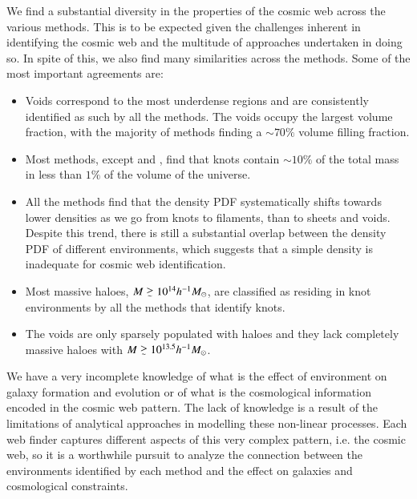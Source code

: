 We find a substantial diversity in the properties of the cosmic web across the various methods. This is to be expected given the challenges inherent in identifying the cosmic web and the multitude of approaches undertaken in doing so. In spite of this, we also find many similarities across the methods. Some of the most important agreements are:
\begin{itemize}
	\item Voids correspond to the most underdense regions and are consistently identified as such by all the methods. The voids occupy the largest volume fraction, with the majority of methods finding a ${\sim}70\%$ volume filling fraction.
	\item Most methods, except \origami{} and \tweb{}, find that knots contain ${\sim}10\%$ of the total mass in less than $1\%$ of the volume of the universe.
	\item All the methods find that the density PDF systematically shifts towards lower densities as we go from knots to filaments, than to sheets and voids. Despite this trend, there is still a substantial overlap between the density PDF of different environments, which suggests that a simple density is inadequate for cosmic web identification. 
	\item Most massive haloes, $M\gsim10^{14}h^{-1}M_{\odot}$, are classified as residing in knot environments by all the methods that identify knots.
	\item The voids are only sparsely populated with haloes and they lack completely massive haloes with $M\gsim10^{13.5}h^{-1}M_{\odot}$.
\end{itemize}

We have a very incomplete knowledge of what is the effect of environment on galaxy formation and evolution or of what is the cosmological information encoded in the cosmic web pattern. The lack of knowledge is a result of the limitations of analytical approaches in modelling these non-linear processes. Each web finder captures different aspects of this very complex pattern, i.e. the cosmic web, so     it is a worthwhile pursuit to analyze the connection between the environments identified by each method and the effect on galaxies and cosmological constraints.




